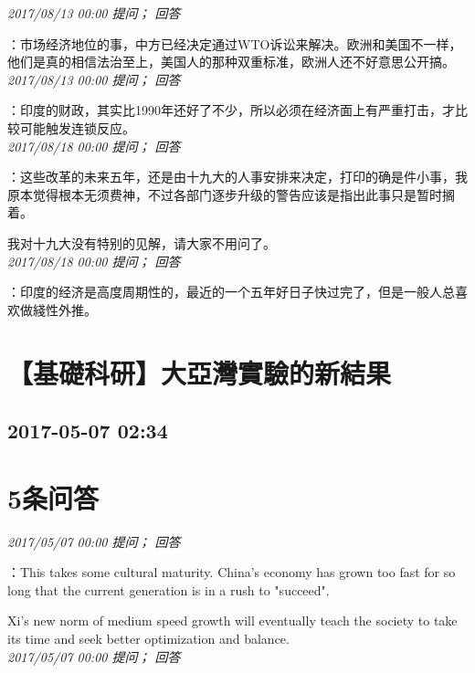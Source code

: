 \documentclass[twocolumn]{ctexart}
\begin{document}
\textit{\hfill\noindent\small 2017/08/13 00:00 提问； 回答}

：市场经济地位的事，中方已经决定通过WTO诉讼来解决。欧洲和美国不一样，他们是真的相信法治至上，美国人的那种双重标准，欧洲人还不好意思公开搞。\\

\textit{\hfill\noindent\small 2017/08/13 00:00 提问； 回答}

：印度的财政，其实比1990年还好了不少，所以必须在经济面上有严重打击，才比较可能触发连锁反应。\\

\textit{\hfill\noindent\small 2017/08/18 00:00 提问； 回答}

：这些改革的未来五年，还是由十九大的人事安排来决定，打印的确是件小事，我原本觉得根本无须费神，不过各部门逐步升级的警告应该是指出此事只是暂时搁着。

我对十九大没有特别的见解，请大家不用问了。\\

\textit{\hfill\noindent\small 2017/08/18 00:00 提问； 回答}

：印度的经济是高度周期性的，最近的一个五年好日子快过完了，但是一般人总喜欢做綫性外推。\\


\section{【基礎科研】大亞灣實驗的新結果}
\subsection{2017-05-07 02:34}


\section{5条问答}

\textit{\hfill\noindent\small 2017/05/07 00:00 提问； 回答}

：This takes some cultural maturity. China's economy has grown too fast for so long that the current generation is in a rush to "succeed". 

Xi's new norm of medium speed growth will eventually teach the society to take its time and seek better optimization and balance.\\

\textit{\hfill\noindent\small 2017/05/07 00:00 提问； 回答}
\end{document}
